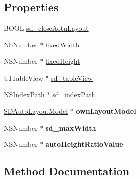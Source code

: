 \subsection*{Properties}
\begin{DoxyCompactItemize}
\item 
B\+O\+OL \mbox{\hyperlink{category_u_i_view_07_s_d_auto_layout_08_a4f692acce7c3a0d019b61554cf4f822c}{sd\+\_\+close\+Aotu\+Layout}}
\item 
N\+S\+Number $\ast$ \mbox{\hyperlink{category_u_i_view_07_s_d_auto_layout_08_a89f6b4ca2df1aa459ca3e51853542ee5}{fixed\+Width}}
\item 
N\+S\+Number $\ast$ \mbox{\hyperlink{category_u_i_view_07_s_d_auto_layout_08_a2ed2ca5d37fcb640c091407d9623dbdb}{fixed\+Height}}
\item 
U\+I\+Table\+View $\ast$ \mbox{\hyperlink{category_u_i_view_07_s_d_auto_layout_08_a3fe94c00196883ca7e2c85ce4348a540}{sd\+\_\+table\+View}}
\item 
N\+S\+Index\+Path $\ast$ \mbox{\hyperlink{category_u_i_view_07_s_d_auto_layout_08_a4b0b5fda451e08c63efa91b90009354b}{sd\+\_\+index\+Path}}
\item 
\mbox{\label{category_u_i_view_07_s_d_auto_layout_08_a0ec863df9dfc708d81f4d991ebb768d2}} 
\mbox{\hyperlink{interface_s_d_auto_layout_model}{S\+D\+Auto\+Layout\+Model}} $\ast$ {\bfseries own\+Layout\+Model}
\item 
\mbox{\label{category_u_i_view_07_s_d_auto_layout_08_a1b01497852bb1f2d998ba174f7ec04e1}} 
N\+S\+Number $\ast$ {\bfseries sd\+\_\+max\+Width}
\item 
\mbox{\label{category_u_i_view_07_s_d_auto_layout_08_a635edd31bc6941d1eba739e443498dcd}} 
N\+S\+Number $\ast$ {\bfseries auto\+Height\+Ratio\+Value}
\end{DoxyCompactItemize}


\subsection{Method Documentation}
\mbox{\label{category_u_i_view_07_s_d_auto_layout_08_a0fb22a4dd54ef8a7be1a1e8e2f92787c}} 
